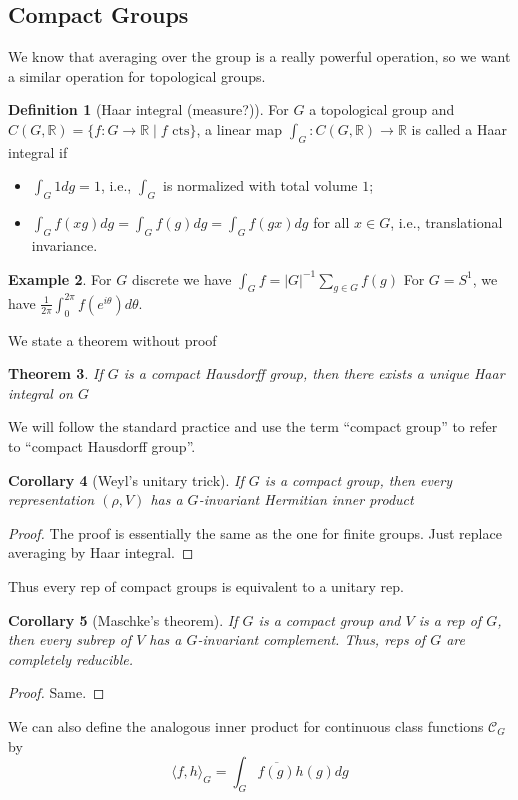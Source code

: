 \documentclass{article}
\theoremstyle{definition}
\newtheorem{defn}{Definition}[section]
\newtheorem{example}[defn]{Example}
\theoremstyle{remark}
\theoremstyle{plain}
\newtheorem{thm}[defn]{Theorem}
\newtheorem{crly}[defn]{Corollary}
\newcommand{\RR}{\mathbb{R}}
\begin{document}
\subsection{Compact Groups}
We know that averaging over the group is a really powerful operation, so we want a similar operation for topological groups.
\begin{defn}[Haar integral (measure?)]
For $G$ a topological group and $C(G,\RR)=\{f:G\to \RR\mid f\text{ cts}\}$, a linear map $\int_G:C(G,\RR)\to\RR$ is called a Haar integral if
\begin{itemize}
    \item $\int_G1dg=1$, i.e., $\int_G$ is normalized with total volume $1$;
    \item $\int_Gf(xg)dg=\int_Gf(g)dg=\int_Gf(gx)dg$ for all $x\in G$, i.e., translational invariance.
\end{itemize}
\end{defn}
\begin{example}
For $G$ discrete we have $\int_G f=|G|^{-1}\sum_{g\in G}f(g)$
For $G=S^1$, we have $\frac{1}{2\pi}\int_0^{2\pi}f(e^{i\theta})d\theta$.
\end{example}
We state a theorem without proof
\begin{thm}
    If $G$ is a compact Hausdorff group, then there exists a unique Haar integral on $G$
\end{thm}
We will follow the standard practice and use the term ``compact group'' to refer to ``compact Hausdorff group''.
\begin{crly}[Weyl's unitary trick]
    If $G$ is a compact group, then every representation $(\rho, V)$ has a $G$-invariant Hermitian inner product
\end{crly}
\begin{proof}
    The proof is essentially the same as the one for finite groups. Just replace averaging by Haar integral.
\end{proof}
Thus every rep of compact groups is equivalent to a unitary rep.
\begin{crly}[Maschke's theorem]
    If $G$ is a compact group and $V$ is a rep of $G$, then every subrep of $V$ has a $G$-invariant complement. Thus, reps of $G$ are completely reducible.
\end{crly}
\begin{proof}
    Same.
\end{proof}
We can also define the analogous inner product for continuous class functions $\mathcal{C}_G$ by
\[\langle f,h\rangle_G=\int_G\overline{f(g)}h(g)dg\]
\end{document}
